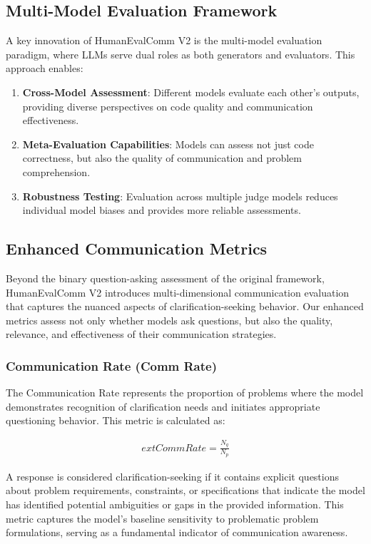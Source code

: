 \documentclass[conference]{IEEEtran}
\begin{document}
\subsection{Multi-Model Evaluation Framework}

A key innovation of HumanEvalComm V2 is the multi-model evaluation paradigm, where LLMs serve dual roles as both generators and evaluators. This approach enables:

\begin{enumerate}
    \item \textbf{Cross-Model Assessment}: Different models evaluate each other's outputs, providing diverse perspectives on code quality and communication effectiveness.
    \item \textbf{Meta-Evaluation Capabilities}: Models can assess not just code correctness, but also the quality of communication and problem comprehension.
    \item \textbf{Robustness Testing}: Evaluation across multiple judge models reduces individual model biases and provides more reliable assessments.
\end{enumerate}

\subsection{Enhanced Communication Metrics}

Beyond the binary question-asking assessment of the original framework, HumanEvalComm V2 introduces multi-dimensional communication evaluation that captures the nuanced aspects of clarification-seeking behavior. Our enhanced metrics assess not only whether models ask questions, but also the quality, relevance, and effectiveness of their communication strategies.

\subsubsection{Communication Rate (Comm Rate)}

The Communication Rate represents the proportion of problems where the model demonstrates recognition of clarification needs and initiates appropriate questioning behavior. This metric is calculated as:

\begin{align}
    	ext{CommRate} = \frac{N_{q}}{N_{p}}
\end{align}

A response is considered clarification-seeking if it contains explicit questions about problem requirements, constraints, or specifications that indicate the model has identified potential ambiguities or gaps in the provided information. This metric captures the model's baseline sensitivity to problematic problem formulations, serving as a fundamental indicator of communication awareness.
\end{document}
